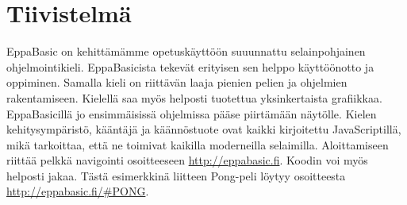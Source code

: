 
\section*{Tiivistelmä}
EppaBasic on kehittämämme opetuskäyttöön suuunnattu
selainpohjainen ohjelmointikieli. EppaBasicista tekevät
erityisen sen helppo käyttöönotto
ja oppiminen. Samalla kieli on riittävän
laaja pienien pelien ja ohjelmien rakentamiseen.
Kielellä saa myös helposti tuotettua
yksinkertaista grafiikkaa. EppaBasicillä jo ensimmäisissä
ohjelmissa pääse piirtämään näytölle.
Kielen kehitysympäristö, kääntäjä ja käännöstuote ovat
kaikki kirjoitettu JavaScriptillä, mikä tarkoittaa, että
ne toimivat kaikilla moderneilla selaimilla. Aloittamiseen
riittää pelkkä navigointi osoitteeseen \url{http://eppabasic.fi}.
Koodin voi myös helposti jakaa. Tästä esimerkkinä liitteen
Pong-peli löytyy osoitteesta \url{http://eppabasic.fi/#PONG}.